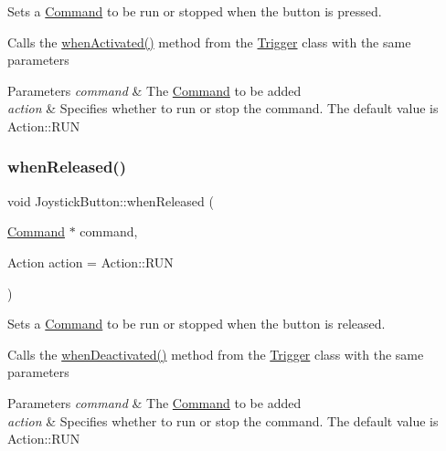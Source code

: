 Sets a \mbox{\hyperlink{classlib_iterative_robot_1_1_command}{Command}} to be run or stopped when the button is pressed. 

Calls the \mbox{\hyperlink{classlib_iterative_robot_1_1_trigger_a1e98ebb42428b05ccab7dda82b9e58dc}{when\+Activated()}} method from the \mbox{\hyperlink{classlib_iterative_robot_1_1_trigger}{Trigger}} class with the same parameters


\begin{DoxyParams}{Parameters}
{\em command} & The \mbox{\hyperlink{classlib_iterative_robot_1_1_command}{Command}} to be added \\
\hline
{\em action} & Specifies whether to run or stop the command. The default value is Action\+::\+R\+UN \\
\hline
\end{DoxyParams}
\mbox{\label{classlib_iterative_robot_1_1_joystick_button_a9ad5475d1005ee5d76fce97675f88f40}} 
\subsubsection{\texorpdfstring{whenReleased()}{whenReleased()}}
{\footnotesize\ttfamily void Joystick\+Button\+::when\+Released (\begin{DoxyParamCaption}\item[{\mbox{\hyperlink{classlib_iterative_robot_1_1_command}{Command}} $\ast$}]{command,  }\item[{Action}]{action = {\ttfamily Action\+:\+:RUN} }\end{DoxyParamCaption})}



Sets a \mbox{\hyperlink{classlib_iterative_robot_1_1_command}{Command}} to be run or stopped when the button is released. 

Calls the \mbox{\hyperlink{classlib_iterative_robot_1_1_trigger_a6459a2d4d3ca0903bb88102d0752a419}{when\+Deactivated()}} method from the \mbox{\hyperlink{classlib_iterative_robot_1_1_trigger}{Trigger}} class with the same parameters


\begin{DoxyParams}{Parameters}
{\em command} & The \mbox{\hyperlink{classlib_iterative_robot_1_1_command}{Command}} to be added \\
\hline
{\em action} & Specifies whether to run or stop the command. The default value is Action\+::\+R\+UN \\
\hline
\end{DoxyParams}
\mbox{\label{classlib_iterative_robot_1_1_joystick_button_abf9016144e1a4e5eaf09183350474081}} 
